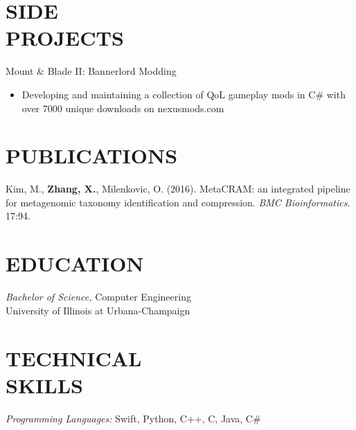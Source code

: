 \documentclass[resmargin]{res}
\begin{document}
\begin{resume}

\section{SIDE\\PROJECTS}
	Mount \& Blade II: Bannerlord Modding
	\begin{itemize}
	\vspace{1mm}
		 \item Developing and maintaining a collection of QoL gameplay mods in C\# with over 7000 unique downloads on nexusmods.com
	\end{itemize}
\section{PUBLICATIONS}
	\textnormal{Kim, M., \textbf{Zhang, X.}, Milenkovic, O. (2016). MetaCRAM: an integrated pipeline for metagenomic taxonomy identification and compression. \textit{BMC Bioinformatics}. 17:94.}

\section{EDUCATION} {\sl Bachelor of Science,} Computer Engineering \\
                University of Illinois at Urbana-Champaign

\section{TECHNICAL \\ SKILLS} 
{\sl Programming Languages:} Swift, Python, C++, C, Java, C\#

\end{resume}
\end{document}
